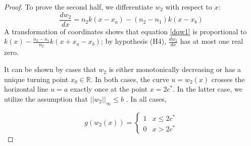 \documentclass[11pt]{article}
\theoremstyle{definition}
\numberwithin{equation}{section}
\numberwithin{thm}{section}
\renewcommand{\a}{a}
\renewcommand{\b}{b}
\newcommand{\m}{n_1}
\newcommand{\mtwo}{n_2}
\begin{document}
\begin{proof}
To prove the second half, we differentiate $w_2$ with respect to $x$:
\begin{equation} \label{dqw1}
\frac{dw_2}{dx} = \mtwo k(x-x_\a) - (\mtwo-\m) k(x-x_\b)
\end{equation}
A transformation of coordinates shows that equation \eqref{dqw1} is proportional to $k(x) - \frac{\mtwo-\m}{\mtwo} k(x+x_\a-x_\b)$; by hypothesis (H4), $\frac{dw_2}{dx}$ has at most one real zero.

It can be shown by cases that $w_2$ is either monotonically decreasing or has a unique turning point $x_0 \in \mathbb R$. In both cases, the curve $u=w_2(x)$ crosses the horizontal line $u=\a$ exactly once at the point $x=2c^*$. In the latter case, we utilize the assumption that $|| w_2 ||_\infty \leq \b$ . In all cases, 


\begin{equation}
g(w_2(x)) = \begin{cases}
1 & x \leq 2c^* \\
0 & x > 2c^*
\end{cases}
\end{equation}


%


\end{proof}
\end{document}
